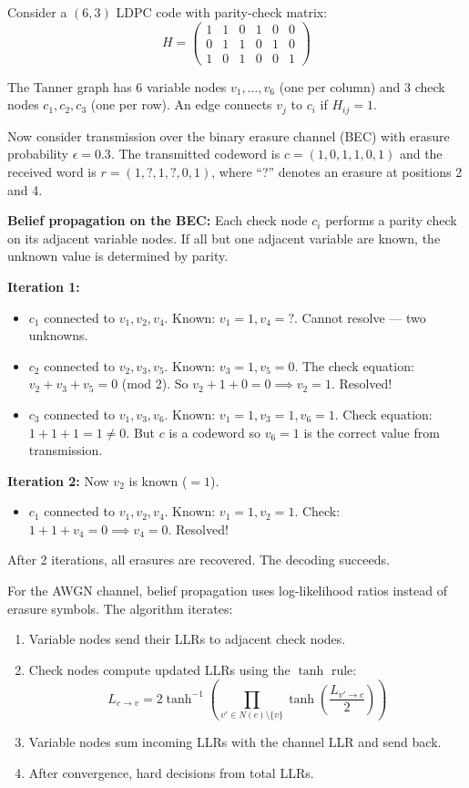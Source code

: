 \begin{example}
Consider a $(6, 3)$ LDPC code with parity-check matrix:
\[
H = \begin{pmatrix}
1 & 1 & 0 & 1 & 0 & 0 \\
0 & 1 & 1 & 0 & 1 & 0 \\
1 & 0 & 1 & 0 & 0 & 1
\end{pmatrix}
\]

The Tanner graph has 6 variable nodes $v_1, \dots, v_6$ (one per column) and 3 check nodes $c_1, c_2, c_3$ (one per row). An edge connects $v_j$ to $c_i$ if $H_{ij} = 1$.

Now consider transmission over the binary erasure channel (BEC) with erasure probability $\epsilon = 0.3$. The transmitted codeword is $c = (1, 0, 1, 1, 0, 1)$ and the received word is $r = (1, ?, 1, ?, 0, 1)$, where ``?'' denotes an erasure at positions 2 and 4.

\textbf{Belief propagation on the BEC:}
Each check node $c_i$ performs a parity check on its adjacent variable nodes. If all but one adjacent variable are known, the unknown value is determined by parity.

\textbf{Iteration 1:}
\begin{itemize}
\item $c_1$ connected to $v_1, v_2, v_4$. Known: $v_1 = 1, v_4 = ?$. Cannot resolve — two unknowns.
\item $c_2$ connected to $v_2, v_3, v_5$. Known: $v_3 = 1, v_5 = 0$. The check equation: $v_2 + v_3 + v_5 = 0$ (mod 2). So $v_2 + 1 + 0 = 0 \implies v_2 = 1$. Resolved!
\item $c_3$ connected to $v_1, v_3, v_6$. Known: $v_1 = 1, v_3 = 1, v_6 = 1$. Check equation: $1 + 1 + 1 = 1 \neq 0$. But $c$ is a codeword so $v_6 = 1$ is the correct value from transmission.
\end{itemize}

\textbf{Iteration 2:}
Now $v_2$ is known ($=1$).
\begin{itemize}
\item $c_1$ connected to $v_1, v_2, v_4$. Known: $v_1 = 1, v_2 = 1$. Check: $1 + 1 + v_4 = 0 \implies v_4 = 0$. Resolved!
\end{itemize}

After 2 iterations, all erasures are recovered. The decoding succeeds.

For the AWGN channel, belief propagation uses log-likelihood ratios instead of erasure symbols. The algorithm iterates:
\begin{enumerate}
\item Variable nodes send their LLRs to adjacent check nodes.
\item Check nodes compute updated LLRs using the $\tanh$ rule:
\[
L_{c \to v} = 2 \tanh^{-1}\left( \prod_{v' \in N(c) \setminus \{v\}} \tanh\left( \frac{L_{v' \to c}}{2} \right) \right)
\]
\item Variable nodes sum incoming LLRs with the channel LLR and send back.
\item After convergence, hard decisions from total LLRs.
\end{enumerate}


\end{example}
